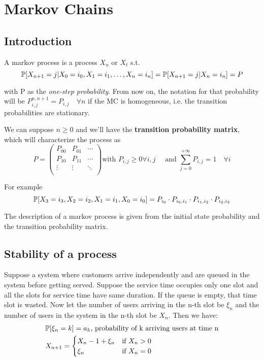 \chapter{Markov Chains}

\section{Introduction}
A markov process is a process $X_n \text{ or } X_t$ s.t.
\begin{equation}
	\mathbb{P}[X_{n+1} = j | X_0 = i_0, X_1 = i_1, \dots, X_n = i_n] = \mathbb{P}[X_{n+1} = j | X_n=i_n] = P
\end{equation}

with P as the \textit{one-step probability}. From now on, the notation for that probability will be $P_{i,j}^{n,n+1}=P_{i,j} \quad \forall n$ if the MC is homogeneous, i.e. the transition probabilities are stationary.

We can suppose $n\ge 0$ and we'll have the \textbf{transition probability matrix}, which will characterize the process as
\begin{equation} P=\begin{pmatrix}
	P_{00} & P_{01} & \cdots  \\
	P_{10} & P_{11} & \cdots \\
	\vdots & \vdots & \ddots  \\
 	\end{pmatrix}
	\text{with } P_{i,j}\ge 0 \forall i,j \quad \text{ and } \sum\limits_{j=0}^{+\infty}P_{i,j} = 1 \quad \forall i
\end{equation}

For example
\begin{equation}
	\mathbb{P}[X_3 = i_3 , X_2 = i_2, X_1 = i_1, X_0 = i_0]=P_{i_0}\cdot P_{i_0,i_1}\cdot P_{i_1,i_2}\cdot P_{i_2,i_3}
\end{equation}

The description of a markov process is given from the initial state probability and the transition probability matrix.

\section{Stability of a process}
Suppose a system where customers arrive independently and are queued in the system before getting served.
Suppose the service time occupies only one slot and all the slots for service time have same duration.
If the queue is empty, that time slot is wasted.
Now let the number of users arriving in the n-th slot be $\xi_n$ and the number of users in
the system in the n-th slot  be $X_n$. Then we have:
 \begin{equation}
 	\begin{split}
 	&\mathbb{P}[\xi_n=k] = a_k \text{, probability of k arriving users at time n}\\
  	&X_{n+1}=
		\begin{cases}
 			X_n -1 +\xi_n &  \text{if } X_n >0 \\
 			\xi_n 			 	&  \text{if } X_n = 0
 		\end{cases}
 	\end{split}
 \end{equation}

